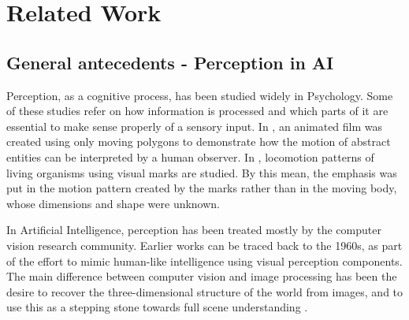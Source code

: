 \documentclass[a4paper, 12pt, openany, oneside]{book}
\begin{document}
\pagestyle{emty} %

\cleardoublepage

\newpage
{}
\tableofcontents

\newpage
\pagestyle{plain}

\chapter{Related Work}


\section{General antecedents - Perception in AI}

Perception, as a cognitive process, has been studied widely in Psychology.  
Some of these studies refer on how information is processed and which parts of it are essential to make sense properly of a sensory input.
In \citep{Heider1944_Experimental}, an animated film was created using only moving polygons to demonstrate how the motion of abstract entities can be interpreted by a human observer.
In \citep{Johansson1973_VisualPer}, locomotion patterns of living organisms using visual marks are studied. 
By this mean, the emphasis was put in the motion pattern created by the marks rather than in the moving body, whose dimensions and shape were unknown.


In Artificial Intelligence, perception has been treated mostly by the computer vision research community.
Earlier works can be traced back to the 1960s, as part of the effort to mimic human-like intelligence using visual perception components. The main difference between computer vision and image processing has been the desire to recover the three-dimensional structure of the world from images, and to use this as a stepping stone towards full scene understanding \citep{Winston1975_PsyCV}. 
\end{document}
